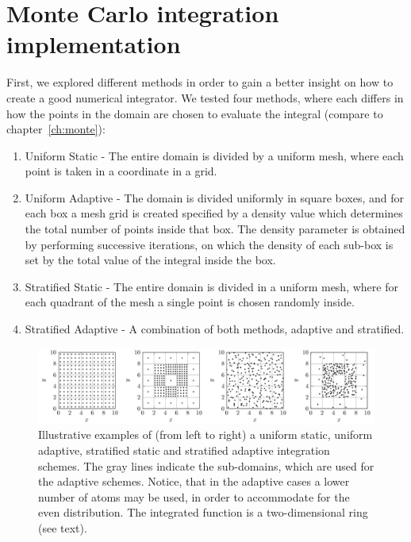 \section{Monte Carlo integration implementation}
\label{ch:monte_app}

First, we explored different methods in order to gain a better insight on how to create a good numerical integrator. We tested four methods, where each differs in how the points in the domain are chosen to evaluate the integral (compare to chapter~\ref{ch:monte}):
\begin{enumerate}
  \item Uniform Static - The entire domain is divided by a uniform mesh, where each point is taken in a coordinate in a grid.
  \item Uniform Adaptive - The domain is divided uniformly in square boxes, and for each box a mesh grid is created
  specified by a density value which determines the total number of points inside that box. The density parameter
  is obtained by performing successive iterations, on which the density of each sub-box is set by the total value of the integral inside
  the box.
  \item Stratified Static - The entire domain is divided in a uniform mesh, where for each quadrant of the mesh
  a single point is chosen randomly inside.
  \item Stratified Adaptive - A combination of both methods, adaptive and stratified.
\end{enumerate}
\begin{figure}[th]
  \begin{center}
    \includegraphics[scale=0.9]{graphs/BoxPlotter.pdf}
	\caption{
	  	Illustrative examples of (from left to right) a uniform static, uniform adaptive, stratified static and stratified adaptive integration schemes. The gray lines indicate the sub-domains, which are used for the adaptive schemes. Notice, that in the adaptive cases a lower number of atoms may be used, in order to accommodate for the even distribution. %
	  	The integrated function is a two-dimensional ring (see text).
  	}
	\label{fig:BoxPlotter}
  \end{center}
\end{figure}

